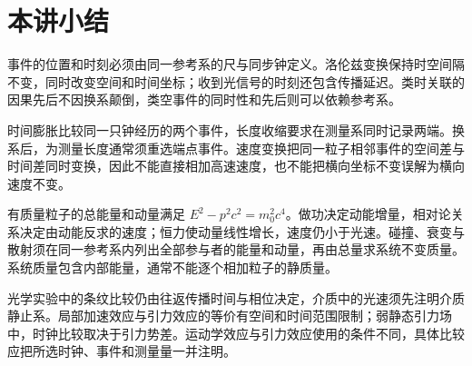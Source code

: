 \section{本讲小结}

事件的位置和时刻必须由同一参考系的尺与同步钟定义。洛伦兹变换保持时空间隔不变，同时改变空间和时间坐标；收到光信号的时刻还包含传播延迟。类时关联的因果先后不因换系颠倒，类空事件的同时性和先后则可以依赖参考系。

时间膨胀比较同一只钟经历的两个事件，长度收缩要求在测量系同时记录两端。换系后，为测量长度通常须重选端点事件。速度变换把同一粒子相邻事件的空间差与时间差同时变换，因此不能直接相加高速速度，也不能把横向坐标不变误解为横向速度不变。

有质量粒子的总能量和动量满足 $E^2-p^2c^2=m_0^2c^4$。做功决定动能增量，相对论关系决定由动能反求的速度；恒力使动量线性增长，速度仍小于光速。碰撞、衰变与散射须在同一参考系内列出全部参与者的能量和动量，再由总量求系统不变质量。系统质量包含内部能量，通常不能逐个相加粒子的静质量。

光学实验中的条纹比较仍由往返传播时间与相位决定，介质中的光速须先注明介质静止系。局部加速效应与引力效应的等价有空间和时间范围限制；弱静态引力场中，时钟比较取决于引力势差。运动学效应与引力效应使用的条件不同，具体比较应把所选时钟、事件和测量量一并注明。
